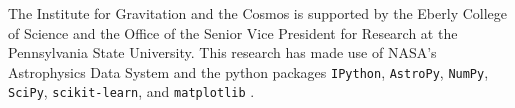 \documentclass[preprint,natbib209]{aastex}
\begin{document}
The Institute for Gravitation and the Cosmos is 
supported by the Eberly College of Science and the Office of the Senior Vice
President for Research at the Pennsylvania 
State University. This research has made use of NASA's Astrophysics Data System 
and the python packages \texttt{IPython}, \texttt{AstroPy}, 
\texttt{NumPy}, \texttt{SciPy}, \texttt{scikit-learn}, and \texttt{matplotlib}
 \citep{ipython, astropy, numpy, scipy, scikit-learn, matplotlib}.



\end{document}
